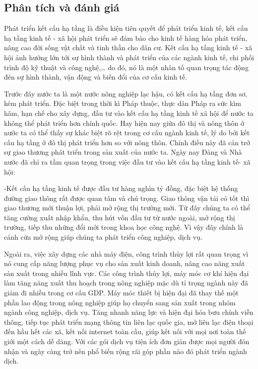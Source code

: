 \subsection{Phân tích và đánh giá}
Phát triển kết cấu hạ tầng là điều kiện tiên quyết để phát triển kinh tế, kết cấu hạ tầng kinh tế - xã hội phát triển sẽ đảm bảo cho kinh tế hàng hóa phát triển, nâng cao đời sống vật chất và tinh thần cho dân cư. Kết cấu hạ tầng kinh tế - xã hội ảnh hưởng lớn tới sự hình thành và phát triển của các ngành kinh tế, chi phối trình độ kỹ thuật và công nghệ,… do đó, nó là một nhân tố quan trọng tác động đén sự hình thành, vận động và biến đổi của cơ cấu kinh tế.

Trước đây nước ta là một nước nông nghiệp lạc hậu, có kết cấu hạ tầng đơn sơ, kém phát triển. Đặc biệt trong thời kì Pháp thuộc, thực dân Pháp ra sức kìm hãm, hạn chế cho xây dựng, đầu tư vào kết cấu hạ tầng kinh tế xã hội để nước ta không thể phát triển hơn chính quốc. Hay hiện nay giữa đô thị và nông thôn ở nước ta có thể thấy sự khác biệt rõ rệt trong cơ cấu ngành kinh tế, lý do bởi kết cấu hạ tầng ở đô thị phát triển hơn so với nông thôn. Chính điều này đã cản trở sự giao thương phát triển trong sản xuất của nước ta. Ngày nay Đảng và Nhà nước đã chỉ ra tầm quan trọng trong việc đầu tư vào kết cấu hạ tầng kinh tế- xã hội:

-Kết cấu hạ tầng kinh tế được đầu tư hàng nghìn tỷ đồng, đặc biệt hệ thống đường giao thông rất được quan tâm và chú trọng. Giao thông vận tải có tốt thì giao thương mới thuận lợi, phải mở rộng thị trường mới. Từ đây chúng ta có thể tăng cường xuất nhập khẩu, thu hút vốn đầu tư từ nước ngoài, mở rộng thị trường, tiếp thu những đổi mới trong khoa học công nghệ. Vì vậy đây chính là cánh cửa mở rộng giúp chúng ta phát triển công nghiệp, dịch vụ.

Ngoài ra, việc xây dựng các nhà máy điện, công trình thủy lợi rất quan trọng vì nó cung cấp năng lượng phục vụ cho sản xuất kinh doanh, nâng cao năng xuất sản xuất trong nhiều lĩnh vực. Các công trình thủy lợi, máy móc cơ khí hiện đại làm tăng năng xuất thu hoạch trong nông nghiệp mặc dù tỉ trọng ngành này đã giảm đi nhiều trong cơ cấu GDP. Máy móc thiết bị hiện đại đã thay thế một phần lao động trong nông nghiệp giúp họ chuyển sang sản xuất trong nhóm ngành công nghiệp, dịch vụ. Tăng nhanh năng lực và hiện đại hóa bưu chính viễn thông, tiếp tục phát triển mạng thông tin liên lạc quốc gia, mở liên lạc điện thoại đến hầu hết các xã, kết nối internet toàn cầu, giúp kết nối với mọi nơi toàn thế giới một cách dễ dàng. Với các gói dịch vụ tiện ích đơn giản được mọi người đón nhận và ngày càng trở nên phổ biến rộng rãi góp phần nào đó phát triển ngành dịch.


